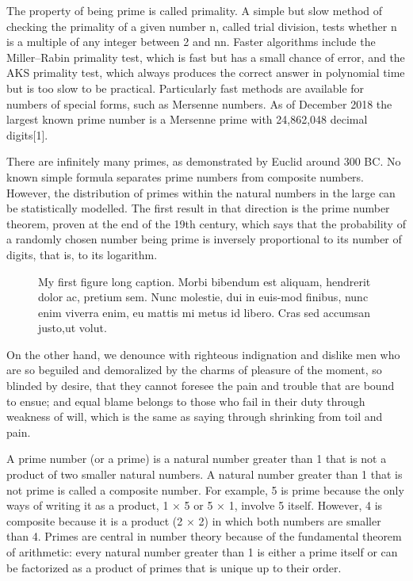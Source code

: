 The property of being prime is called primality. A simple but slow method of
checking the primality of a given number n, called trial
division, tests whether n is a multiple of any integer between
2 and { { {n}}}{ {n}}. Faster algorithms include the
Miller–Rabin primality test, which is fast but has a small chance of error, and
the AKS primality test, which always produces the correct answer in polynomial
time but is too slow to be practical. Particularly fast methods are available
for numbers of special forms, such as Mersenne numbers. As of December 2018 the
largest known prime number is a Mersenne prime with 24,862,048 decimal
digits[1].

There are infinitely many primes, as demonstrated by Euclid around 300 BC. No
known simple formula separates prime numbers from composite numbers. However,
the distribution of primes within the natural numbers in the large can be
statistically modelled. The first result in that direction is the prime number
theorem, proven at the end of the 19th century, which says that the probability
of a randomly chosen number being prime is inversely proportional to its number
of digits, that is, to its logarithm.

\begin{figure}[ht]
  \centering
  
  \caption[My first figure short caption]{My first figure long caption. Morbi
    bibendum est aliquam, hendrerit dolor ac, pretium sem. Nunc molestie, dui in
    euis-mod finibus, nunc enim viverra enim, eu mattis mi metus id libero. Cras
    sed accumsan justo,ut volut.}
  \label{fig:label}
\end{figure}

On the other hand, we denounce with righteous indignation and dislike men who
are so beguiled and demoralized by the charms of pleasure of the moment, so
blinded by desire, that they cannot foresee the pain and trouble that are bound
to ensue; and equal blame belongs to those who fail in their duty through
weakness of will, which is the same as saying through shrinking from toil and
pain.

A prime number (or a prime) is a natural number greater than 1 that is not a
product of two smaller natural numbers. A natural number greater than 1 that is
not prime is called a composite number. For example, 5 is prime because the only
ways of writing it as a product, 1 × 5 or 5 × 1, involve 5 itself. However, 4 is
composite because it is a product (2 × 2) in which both numbers are smaller than
4. Primes are central in number theory because of the fundamental theorem of
arithmetic: every natural number greater than 1 is either a prime itself or can
be factorized as a product of primes that is unique up to their order.

